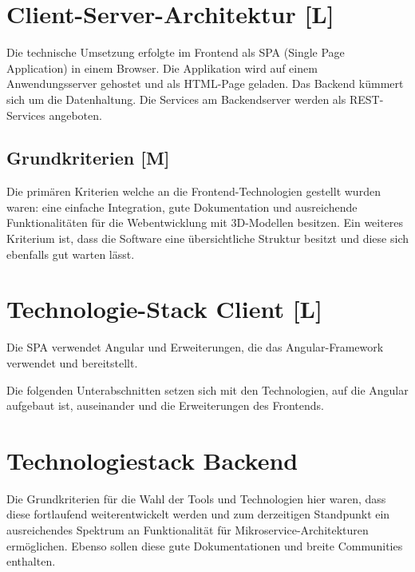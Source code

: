 \section{Client-Server-Architektur [L]}
Die technische Umsetzung erfolgte im Frontend als SPA (Single Page Application) in einem Browser. Die Applikation wird auf einem Anwendungsserver gehostet und als HTML-Page geladen. Das Backend kümmert sich um die Datenhaltung. Die Services am Backendserver werden als REST-Services angeboten.

\subsection{Grundkriterien [M]} 
Die primären Kriterien welche an die Frontend-Technologien gestellt wurden waren: eine einfache Integration, gute Dokumentation und ausreichende Funktionalitäten für die Webentwicklung mit 3D-Modellen besitzen. Ein weiteres Kriterium ist, dass die Software eine übersichtliche Struktur besitzt und diese sich ebenfalls gut warten lässt. 

  

\section{Technologie-Stack Client [L]}
Die SPA verwendet Angular und Erweiterungen, die das Angular-Framework verwendet und bereitstellt.

Die folgenden Unterabschnitten setzen sich mit den Technologien, auf die Angular aufgebaut ist, auseinander und die Erweiterungen des Frontends.





\section{Technologiestack Backend}
Die Grundkriterien für die Wahl der Tools und Technologien hier waren, dass diese fortlaufend weiterentwickelt werden und zum derzeitigen Standpunkt ein ausreichendes Spektrum an Funktionalität für Mikroservice-Architekturen ermöglichen.\cite{MicroserviceAbout} Ebenso sollen diese gute Dokumentationen und breite Communities enthalten. 



